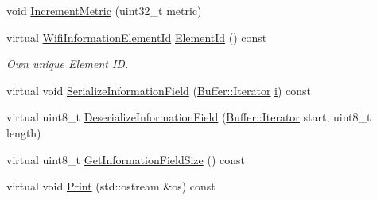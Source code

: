 \begin{DoxyCompactItemize}
void \hyperlink{classns3_1_1dot11s_1_1IeRann_a7423bf63e550e391b5955f1958063277}{Increment\+Metric} (uint32\+\_\+t metric)
\item 
virtual \hyperlink{namespacens3_aeb185e0c8a60816016bca079f1420478}{Wifi\+Information\+Element\+Id} \hyperlink{classns3_1_1dot11s_1_1IeRann_a9ea0ede0e8afcfef0d956acf17fb27e5}{Element\+Id} () const 
\begin{DoxyCompactList}\small\item\em Own unique Element ID. \end{DoxyCompactList}\item 
virtual void \hyperlink{classns3_1_1dot11s_1_1IeRann_adc18929d199e5d029cf6fd2c22d792eb}{Serialize\+Information\+Field} (\hyperlink{classns3_1_1Buffer_1_1Iterator}{Buffer\+::\+Iterator} \hyperlink{lte__uplink__power__control_8m_a6f6ccfcf58b31cb6412107d9d5281426}{i}) const 
\item 
virtual uint8\+\_\+t \hyperlink{classns3_1_1dot11s_1_1IeRann_a5561ca960fd8728857042b0ccb8dc6eb}{Deserialize\+Information\+Field} (\hyperlink{classns3_1_1Buffer_1_1Iterator}{Buffer\+::\+Iterator} start, uint8\+\_\+t length)
\item 
virtual uint8\+\_\+t \hyperlink{classns3_1_1dot11s_1_1IeRann_a2bd45dee5face69ff16caca86c8d2e91}{Get\+Information\+Field\+Size} () const 
\item 
virtual void \hyperlink{classns3_1_1dot11s_1_1IeRann_aa5e2ddcfb08ef05c57c41fb1b73ed60d}{Print} (std\+::ostream \&os) const 
\end{DoxyCompactItemize}
